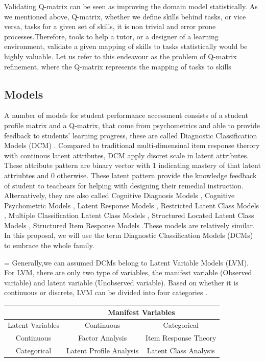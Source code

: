 \documentclass[11pt]{article}
\begin{document}
  Validating Q-matrix can be seen as improving the domain model statistically. As we mentioned above, Q-matrix, whether we define skills behind tasks, or vice versa, tasks for a given set of skills, it is non trivial and error prone processes.Therefore, tools to help a tutor, or a designer of a learning environment, validate a given mapping of skills to tasks statistically would be highly valuable. Let us refer to this endeavour as the problem of Q-matrix refinement, where the Q-matrix represents the mapping of tasks to
skills

\subsection{Models}
A number of models for student performance accessment consists of  a student profile matrix and a Q-matrix, that come from psychometrics and able to provide feedback to students' learning progress, these are called Diagnostic Classification Models (DCM) \cite{templin2010diagnostic}. Compared to traditional multi-dimensinal item response therory with continous latent attributes, DCM apply discret scale in latent attributes. These attribute pattern are binary vector with 1 indicating  mastery of that latent attriubtes and 0 otherwise. These latent pattern provide the knowledge feedback of student to teachears for helping with designing their remedial instruction. Alternatively, they are also called Cognitive Diagnosis Models \cite{templin2006measurement}, Cognitive Psychometric Models \cite{rupp2007answer}, Latent Response Models \cite{maris1995psychometric}, Restricted Latent Class Models \cite{haertel1989using}, Multiple Classification Latent Class Models \cite{maris1999estimating}, Structured Located Latent Class Models \cite{xu2008fitting}, Structured Item Response Models \cite{rupp2007cognitive}.These models are relatively similar. In this proposal, we will use the term Diagnostic Classification Models (DCMs) to embrace the whole family.

\parskip = \baselineskip
Generally,we can assumed DCMs belong to Latent Variable Models (LVM). For LVM, there are only two type of variables, the manifest variable (Observed variable) and latent variable (Unobserved variable). Based on whether it is continuous or discrete, LVM can be divided into four categories \cite{galbraith2002analysis}.

\begin{tabular}{|c||c|c|}
\hline
          {} & \multicolumn{2}{c|}{Manifest Variables}\\ \hline \hline
 Latent Variables & Continuous & Categorical  \\ \hline
 Continuous & Factor Analysis & Item Response Theory \\ \hline
 Categorical & Latent Profile Analysis & Latent Class Analysis \\ \hline
\end{tabular}
\\
\end{document}
